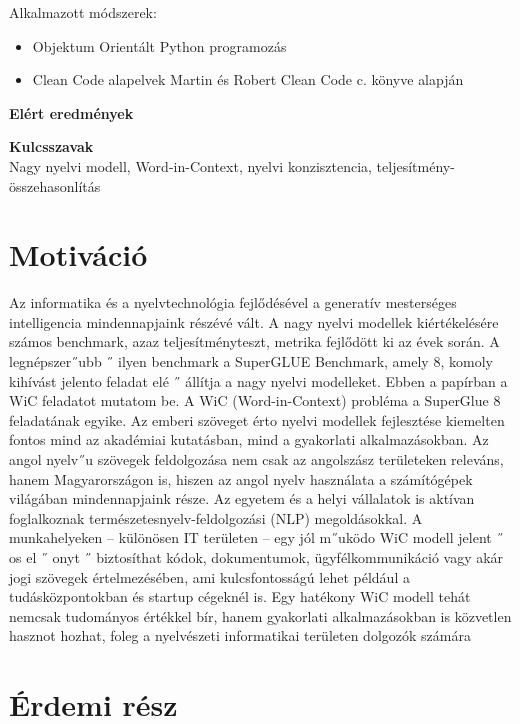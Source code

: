 \documentclass[12pt]{report}
\theoremstyle{definition}
\begin{document}
        Alkalmazott módszerek:
      \begin{itemize}

        \item Objektum Orientált Python programozás
        \item Clean Code alapelvek Martin és Robert Clean Code c. könyve \cite{martin2008cleancode} alapján

      \end{itemize}

  \textbf{Elért eredmények}

 \textbf{Kulcsszavak}
        \\
       Nagy nyelvi modell, Word-in-Context, nyelvi konzisztencia, teljesítmény-összehasonlítás

\chapter*{Motiváció}

Az informatika és a nyelvtechnológia fejlődésével a generatív mesterséges intelligencia mindennapjaink részévé vált. A nagy nyelvi modellek kiértékelésére számos
benchmark, azaz teljesítményteszt, metrika fejlődött ki az évek során. A legnépszer˝ubb ˝
ilyen benchmark a SuperGLUE Benchmark, amely 8, komoly kihívást jelento feladat elé ˝
állítja a nagy nyelvi modelleket. Ebben a papírban a WiC feladatot mutatom be.
A WiC (Word-in-Context) probléma a SuperGlue 8 feladatának egyike. Az emberi
szöveget érto nyelvi modellek fejlesztése kiemelten fontos mind az akadémiai kutatásban, mind a gyakorlati alkalmazásokban. Az angol nyelv˝u szövegek feldolgozása nem
csak az angolszász területeken releváns, hanem Magyarországon is, hiszen az angol nyelv
használata a számítógépek világában mindennapjaink része. Az egyetem és a helyi vállalatok is aktívan foglalkoznak természetesnyelv-feldolgozási (NLP) megoldásokkal. A
munkahelyeken – különösen IT területen – egy jól m˝uködo WiC modell jelent ˝ os el ˝ onyt ˝
biztosíthat kódok, dokumentumok, ügyfélkommunikáció vagy akár jogi szövegek értelmezésében, ami kulcsfontosságú lehet például a tudásközpontokban és startup cégeknél
is. Egy hatékony WiC modell tehát nemcsak tudományos értékkel bír, hanem gyakorlati
alkalmazásokban is közvetlen hasznot hozhat, foleg a nyelvészeti informatikai területen dolgozók számára


\chapter{Érdemi rész}
\end{document}
